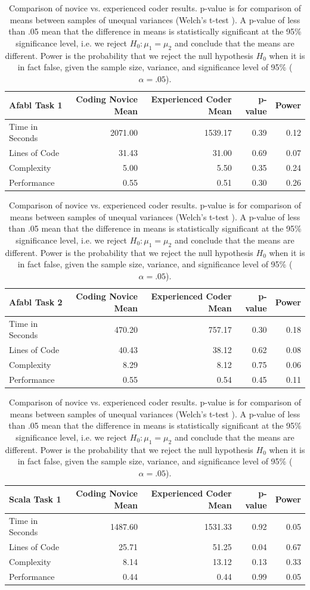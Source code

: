 \begin{center}
\begin{table}[h]
\caption{Comparison of novice vs. experienced coder results. p-value is for comparison of means between samples of unequal variances (Welch's t-test \cite{welch1947generalization}). A p-value of less than .05 mean that the difference in means is statistically significant at the 95\% significance level, i.e. we reject $H_0: \mu_1 = \mu_2$ and conclude that the means are different. Power is the probability that we reject the null hypothesis $H_0$ when it is in fact false, given the sample size, variance, and significance level of 95\% ($\alpha = .05$).}

\begin{center}

\begin{tabular}{|l|r|r|r|r|}\hline
Afabl Task 1 & Coding Novice Mean & Experienced Coder Mean & p-value & Power\\\hline
Time in Seconds & 2071.00 & 1539.17 & 0.39 & 0.12\\
Lines of Code & 31.43 & 31.00 & 0.69 & 0.07\\
Complexity & 5.00 & 5.50 & 0.35 & 0.24\\
Performance & 0.55 & 0.51 & 0.30 & 0.26\\
\hline
\end{tabular}


\begin{tabular}{|l|r|r|r|r|}\hline
Afabl Task 2 & Coding Novice Mean & Experienced Coder Mean & p-value & Power\\\hline
Time in Seconds & 470.20 & 757.17 & 0.30 & 0.18\\
Lines of Code & 40.43 & 38.12 & 0.62 & 0.08\\
Complexity & 8.29 & 8.12 & 0.75 & 0.06\\
Performance & 0.55 & 0.54 & 0.45 & 0.11\\
\hline
\end{tabular}


\begin{tabular}{|l|r|r|r|r|}\hline
Scala Task 1 & Coding Novice Mean & Experienced Coder Mean & p-value & Power\\\hline
Time in Seconds & 1487.60 & 1531.33 & 0.92 & 0.05\\
Lines of Code & 25.71 & 51.25 & 0.04 & 0.67\\
Complexity & 8.14 & 13.12 & 0.13 & 0.33\\
Performance & 0.44 & 0.44 & 0.99 & 0.05\\
\hline
\end{tabular}



\end{center}
\end{table}
\end{center}

